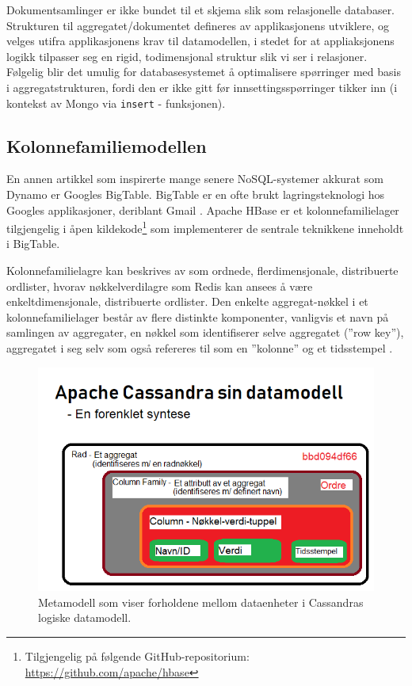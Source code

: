 Dokumentsamlinger er ikke bundet til et skjema slik som relasjonelle databaser. Strukturen til aggregatet/dokumentet defineres av applikasjonens utviklere, og velges utifra applikasjonens krav til datamodellen, i stedet for at appliaksjonens logikk tilpasser seg en rigid, todimensjonal struktur slik vi ser i relasjoner. Følgelig blir det umulig for databasesystemet å optimalisere spørringer med basis i aggregatstrukturen, fordi den er ikke gitt før innsettingsspørringer tikker inn (i kontekst av Mongo via \texttt{insert} - funksjonen).

\subsection{Kolonnefamiliemodellen}

En annen artikkel som inspirerte mange senere NoSQL-systemer akkurat som Dynamo er Googles BigTable. BigTable er en ofte brukt lagringsteknologi hos Googles applikasjoner, deriblant Gmail \citep{elmasri2014}. Apache HBase er et kolonnefamilielager tilgjengelig i åpen kildekode\footnote{Tilgjengelig på følgende GitHub-repositorium: \url{https://github.com/apache/hbase}} som implementerer de sentrale teknikkene inneholdt i BigTable.

Kolonnefamilielagre kan beskrives av \cite{elmasri2014} som ordnede, flerdimensjonale, distribuerte ordlister, hvorav nøkkelverdilagre som Redis kan ansees å være enkeltdimensjonale, distribuerte ordlister. Den enkelte aggregat-nøkkel i et kolonnefamilielager består av flere distinkte komponenter, vanligvis et navn på samlingen av aggregater, en nøkkel som identifiserer selve aggregatet (''row key''), aggregatet i seg selv som også refereres til som en ''kolonne'' og et tidsstempel \citep{elmasri2014}.

\newpage

\begin{figure}[!ht]
    \centering
    \includegraphics[scale=0.7]{fig/kolonneorientert.png}
    \caption{Metamodell som viser forholdene mellom dataenheter i Cassandras logiske datamodell.}
    \label{fig3}
\end{figure}

